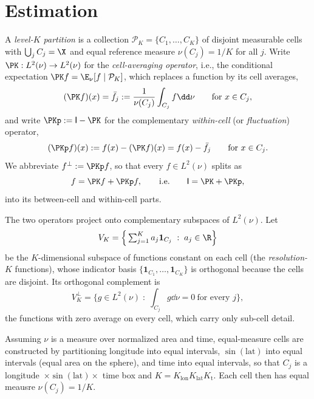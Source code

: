 \section{Estimation}
\label{sec:estimation}

\begin{definition}
\label{def:partition}
A \emph{level-$K$ partition} is a collection
$\mathcal{P}_K=\{C_1,\dots,C_K\}$ of disjoint measurable cells with
$\bigcup_j C_j=\X$ and equal reference measure $\nu(C_j)=1/K$ for all
$j$. Write $\PK:L^2(\nu)\to L^2(\nu)$ for the \emph{cell-averaging
operator}, i.e., the conditional expectation
$\PK f=\E_\nu[f\mid\mathcal{P}_K]$, which replaces a function by its cell
averages,
\[
  (\PK f)(x)=\bar f_j:=\frac{1}{\nu(C_j)}\int_{C_j} f\dd\nu
  \qquad\text{for }x\in C_j ,
\]
and write $\PKp:=\mathsf{I}-\PK$ for the complementary
\emph{within-cell} (or \emph{fluctuation}) operator,
\[
  (\PKp f)(x) := f(x)-(\PK f)(x) = f(x)-\bar f_j
  \qquad\text{for }x\in C_j .
\]
We abbreviate $f^{\perp}:=\PKp f$, so that every $f\in L^2(\nu)$ splits
as
\begin{equation}
  f=\PK f+\PKp f,\qquad\text{i.e.}\qquad \mathsf{I}=\PK+\PKp ,
  \label{eq:split}
\end{equation}
into its between-cell and within-cell parts.
\end{definition}

The two operators project onto complementary subspaces of $L^2(\nu)$.
Let
\[
  V_K=\Big\{\textstyle\sum_{j=1}^{K}a_j\mathbf{1}_{C_j}\;:\;a_j\in\R\Big\}
\]
be the $K$-dimensional subspace of functions constant on each cell (the
\emph{resolution-$K$} functions), whose indicator basis
$\{\mathbf{1}_{C_1},\dots,\mathbf{1}_{C_K}\}$ is orthogonal because the
cells are disjoint. Its orthogonal complement is
\[
  V_K^{\perp}=\Big\{g\in L^2(\nu)\;:\;\int_{C_j}g\dd\nu=0
    \ \text{for every }j\Big\},
\]
the functions with zero average on every cell, which carry only sub-cell
detail.

\begin{remark}
\label{rem:buildK}
Assuming $\nu$ is a measure over normalized area and time, equal-measure
cells are constructed by partitioning  
longitude into equal intervals, $\sin(\mathrm{lat})$ into equal
intervals (equal area on the sphere), and time into equal intervals,
so that $C_j$ is a longitude~$\times\sin(\mathrm{lat})\times$ time box
and $K=K_{\mathrm{lon}}K_{\mathrm{lat}}K_{\mathrm{t}}$. Each cell then
has equal meausre $\nu(C_j)=1/K$.
\end{remark}

